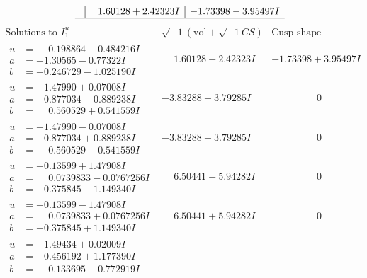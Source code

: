 \documentclass[1p]{elsarticle_modified}
\theoremstyle{definition}
\newcommand{\I}{\sqrt{-1}}
\begin{document}
$$\begin{array}{c|c|c}
 & \phantom{-}1.60128 + 2.42323 I & -1.73398 - 3.95497 I\\
 \hline 
 \end{array}$$\newpage$$\begin{array}{c|c|c}  
\text{Solutions to }I^u_{1}& \I (\text{vol} + \sqrt{-1}CS) & \text{Cusp shape}\\
 \hline 
\begin{aligned}
u &= \phantom{-}0.198864 - 0.484216 I \\
a &= -1.30565 - 0.77322 I \\
b &= -0.246729 - 1.025190 I\end{aligned}
 & \phantom{-}1.60128 - 2.42323 I & -1.73398 + 3.95497 I \\ \hline\begin{aligned}
u &= -1.47990 + 0.07008 I \\
a &= -0.877034 - 0.889238 I \\
b &= \phantom{-}0.560529 + 0.541559 I\end{aligned}
 & -3.83288 + 3.79285 I & \phantom{-0.000000 } 0 \\ \hline\begin{aligned}
u &= -1.47990 - 0.07008 I \\
a &= -0.877034 + 0.889238 I \\
b &= \phantom{-}0.560529 - 0.541559 I\end{aligned}
 & -3.83288 - 3.79285 I & \phantom{-0.000000 } 0 \\ \hline\begin{aligned}
u &= -0.13599 + 1.47908 I \\
a &= \phantom{-}0.0739833 - 0.0767256 I \\
b &= -0.375845 - 1.149340 I\end{aligned}
 & \phantom{-}6.50441 - 5.94282 I & \phantom{-0.000000 } 0 \\ \hline\begin{aligned}
u &= -0.13599 - 1.47908 I \\
a &= \phantom{-}0.0739833 + 0.0767256 I \\
b &= -0.375845 + 1.149340 I\end{aligned}
 & \phantom{-}6.50441 + 5.94282 I & \phantom{-0.000000 } 0 \\ \hline\begin{aligned}
u &= -1.49434 + 0.02009 I \\
a &= -0.456192 + 1.177390 I \\
b &= \phantom{-}0.133695 - 0.772919 I\end{aligned}

\end{array}$$
\end{document}
